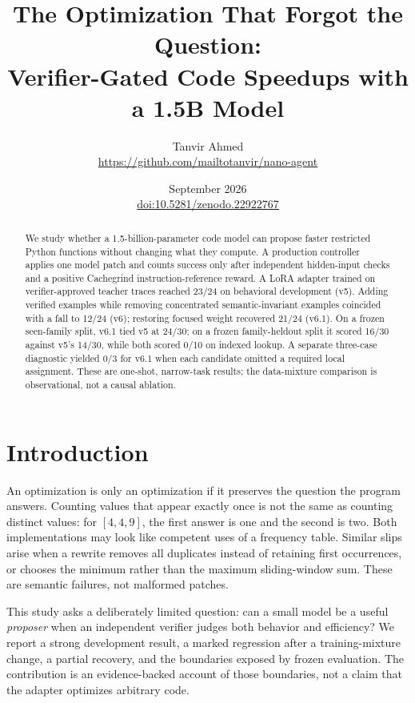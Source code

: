 \documentclass[11pt]{article}
\title{The Optimization That Forgot the Question:\\Verifier-Gated Code Speedups with a 1.5B Model}
\author{Tanvir Ahmed\\\small\url{https://github.com/mailtotanvir/nano-agent}}
\date{September 2026\\\href{https://doi.org/10.5281/zenodo.22922767}{doi:10.5281/zenodo.22922767}}
\begin{document}
\maketitle
\begin{abstract}
We study whether a 1.5-billion-parameter code model can propose faster
restricted Python functions without changing what they compute. A production
controller applies one model patch and counts success only after independent
hidden-input checks and a positive Cachegrind instruction-reference reward.
A LoRA adapter trained on verifier-approved teacher traces reached 23/24 on
behavioral development (v5). Adding verified examples while removing
concentrated semantic-invariant examples coincided with a fall to 12/24
(v6); restoring focused weight recovered 21/24 (v6.1). On a frozen
seen-family split, v6.1 tied v5 at 24/30; on a frozen family-heldout split it
scored 16/30 against v5's 14/30, while both scored 0/10 on indexed lookup.
A separate three-case diagnostic yielded 0/3 for v6.1 when each candidate
omitted a required local assignment. These are one-shot, narrow-task results;
the data-mixture comparison is observational, not a causal ablation.
\end{abstract}

\section{Introduction}
An optimization is only an optimization if it preserves the question the
program answers. Counting values that appear exactly once is not the same as
counting distinct values: for $[4,4,9]$, the first answer is one and the
second is two. Both implementations may look like competent uses of a
frequency table. Similar slips arise when a rewrite removes all duplicates
instead of retaining first occurrences, or chooses the minimum rather than
the maximum sliding-window sum. These are semantic failures, not malformed
patches.

This study asks a deliberately limited question: can a small model be a
useful \emph{proposer} when an independent verifier judges both behavior and
efficiency? We report a strong development result, a marked regression after
a training-mixture change, a partial recovery, and the boundaries exposed by
frozen evaluation. The contribution is an evidence-backed account of those
boundaries, not a claim that the adapter optimizes arbitrary code.
\end{document}

